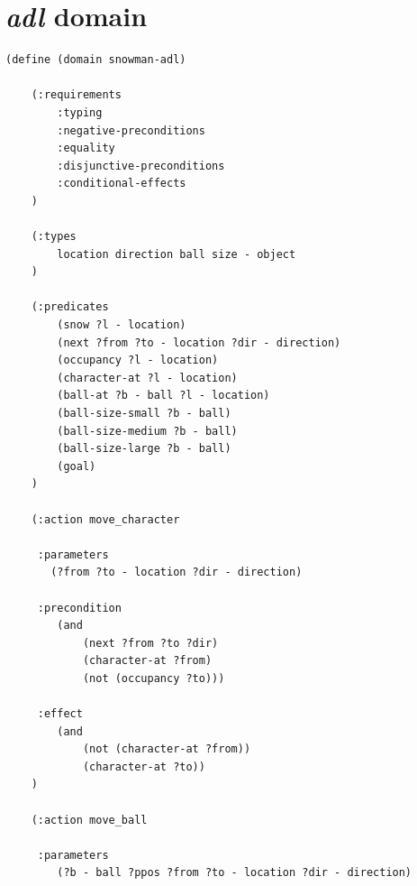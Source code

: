 \documentclass{report}
\theoremstyle{plain}
\begin{document}
\section{\emph{adl} domain}
\label{annex:pddl-adl}
\begin{lstlisting}
(define (domain snowman-adl)
    
    (:requirements
        :typing
        :negative-preconditions
        :equality
        :disjunctive-preconditions
        :conditional-effects
    )

    (:types 
        location direction ball size - object
    )

    (:predicates
        (snow ?l - location)
        (next ?from ?to - location ?dir - direction)
        (occupancy ?l - location)
        (character-at ?l - location)
        (ball-at ?b - ball ?l - location)
        (ball-size-small ?b - ball)
        (ball-size-medium ?b - ball)
        (ball-size-large ?b - ball)
        (goal)
    )
    
    (:action move_character
    
     :parameters
       (?from ?to - location ?dir - direction)

     :precondition
        (and
            (next ?from ?to ?dir)
            (character-at ?from)
            (not (occupancy ?to)))

     :effect
        (and
            (not (character-at ?from))
            (character-at ?to))
    )
    
    (:action move_ball

     :parameters
        (?b - ball ?ppos ?from ?to - location ?dir - direction)


\end{lstlisting}
\end{document}

